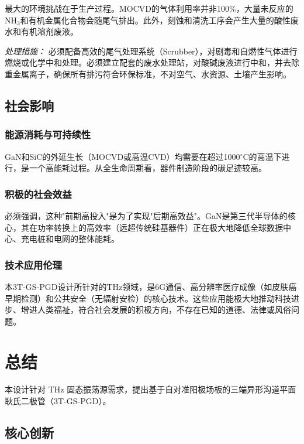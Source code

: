 \documentclass[12pt,a4paper]{article}
\begin{document}
最大的环境挑战在于生产过程。MOCVD的气体利用率并非100\%，大量未反应的NH$_3$和有机金属化合物会随尾气排出。此外，刻蚀和清洗工序会产生大量的酸性废水和有机溶剂废液。

\emph{处理措施：} 必须配备高效的尾气处理系统（Scrubber），对剧毒和自燃性气体进行燃烧或化学中和处理。必须建立配套的废水处理站，对酸碱废液进行中和，并去除重金属离子，确保所有排污符合环保标准，不对空气、水资源、土壤产生影响。

\subsection{社会影响}

\subsubsection{能源消耗与可持续性}

GaN和SiC的外延生长（MOCVD或高温CVD）均需要在超过1000$^{\circ}$C的高温下进行，是一个高能耗过程。从全生命周期看，器件制造阶段的碳足迹较高。

\subsubsection{积极的社会效益}

必须强调，这种"前期高投入"是为了实现"后期高效益"。GaN是第三代半导体的核心，其在功率转换上的高效率（远超传统硅基器件）正在极大地降低全球数据中心、充电桩和电网的整体能耗。

\subsubsection{技术应用伦理}

本3T-GS-PGD设计所针对的THz领域，是6G通信、高分辨率医疗成像（如皮肤癌早期检测）和公共安全（无辐射安检）的核心技术。这些应用能极大地推动科技进步、增进人类福祉，符合社会发展的积极方向，不存在已知的道德、法律或风俗问题。

\clearpage

\section{总结}

本设计针对 THz 固态振荡源需求，提出基于自对准阳极场板的三端异形沟道平面耿氏二极管（3T-GS-PGD）。

\subsection{核心创新}
\end{document}
